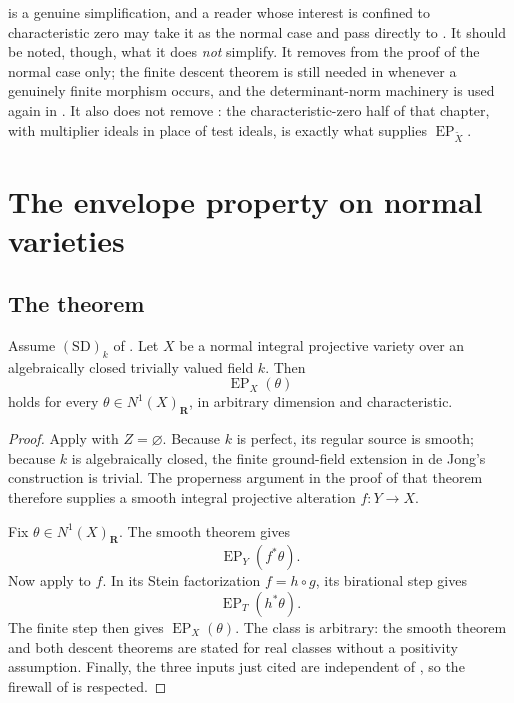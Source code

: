 \begin{remark}
\label{rem:ch42-shortcut-scope}
 is a genuine simplification, and a reader
whose interest is confined to characteristic zero may take it as the normal
case and pass directly to .  It
should be noted, though, what it does \emph{not} simplify.  It removes
 from the proof of the normal case only; the
finite descent theorem is still needed in
 whenever a genuinely finite morphism
occurs, and the determinant-norm machinery is used again in
.  It also does not remove
: the characteristic-zero half of that
chapter, with multiplier ideals in place of test ideals, is exactly what
supplies $\operatorname{EP}_{\widetilde X}$.
\end{remark}

\section{The envelope property on normal varieties}
\label{sec:ch42-normal-theorem}

\subsection{The theorem}
\label{sec:ch42-theorem}

\begin{theorem}\label{thm:bj-normal-envelope}
Assume $\mathrm{(SD)}_k$ of .
Let $X$ be a normal integral projective variety over an algebraically
closed trivially valued field $k$.
Then
\[
                         \operatorname{EP}_X(\theta)
\tag{42.7}\label{eq:bj-normal-envelope}
\]
holds for every $\theta\in N^1(X)_{\mathbf R}$, in arbitrary dimension and
characteristic.
\end{theorem}

\begin{proof}
Apply  with $Z=\varnothing$.  Because $k$ is
perfect, its regular source is smooth; because $k$ is algebraically closed,
the finite ground-field extension in de Jong's construction is trivial.
The properness argument in the proof of that theorem therefore supplies a
smooth integral projective alteration $f:Y\to X$.

Fix $\theta\in N^1(X)_{\mathbf R}$.  The smooth theorem gives
\[
                         \operatorname{EP}_Y(f^*\theta).
\tag{42.8}\label{eq:bj-alteration-smooth-ep}
\]
Now apply  to $f$.  In its Stein
factorization $f=h\circ g$, its birational step gives
\[
                         \operatorname{EP}_T(h^*\theta).
\tag{42.9}\label{eq:bj-alteration-middle-ep}
\]
The finite step then gives $\operatorname{EP}_X(\theta)$.  The class is
arbitrary: the smooth theorem and both descent theorems are stated for real
classes without a positivity assumption.  Finally, the three inputs just
cited are independent of , so the firewall of
 is respected.
\end{proof}

